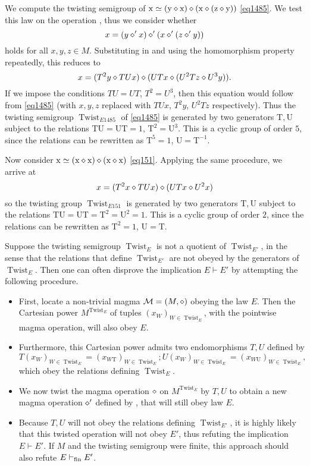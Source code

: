\begin{example}  We compute the twisting semigroup of $\mathrm{x} \simeq (\mathrm{y} \diamond \mathrm{x}) \diamond (\mathrm{x} \diamond (\mathrm{z} \diamond \mathrm{y}))$ \eqref{eq1485}.  We test this law on the operation , thus we consider whether
$$x = (y \diamond' x) \diamond' (x \diamond' (z \diamond' y))$$
holds for all $x,y,z \in M$.  Substituting in  and using the homomorphism property repeatedly, this reduces to
$$x = (T^2y \diamond TUx) \diamond (UTx \diamond (U^2T z \diamond U^3y)).$$
If we impose the conditions $TU=UT$, $T^2 = U^3$, then this equation would follow from \eqref{eq1485} (with $x,y,z$ replaced with $TUx$, $T^2 y$, $U^2 Tz$ respectively).  Thus the twisting semigroup $\operatorname{Twist}_{E1485}$ of \eqref{eq1485} is generated by two generators $\mathrm{T}, \mathrm{U}$ subject to the relations $\mathrm{T} \mathrm{U}=\mathrm{U} \mathrm{T} = 1$, $\mathrm{T}^2 = \mathrm{U}^3$.  This is a cyclic group of order $5$, since the relations can be rewritten as $\mathrm{T}^5 = 1$, $\mathrm{U} = \mathrm{T}^{-1}$.

Now consider $\mathrm{x} \simeq (\mathrm{x} \diamond \mathrm{x}) \diamond (\mathrm{x} \diamond \mathrm{x})$ \eqref{eq151}.  Applying the same procedure, we arrive at
$$x = (T^2 x \diamond TUx) \diamond (UT x \diamond U^2 x)$$
so the twisting group $\operatorname{Twist}_{E151}$ is generated by two generators $\mathrm{T}, \mathrm{U}$ subject to the relations $\mathrm{T} \mathrm{U}=\mathrm{U} \mathrm{T} = \mathrm{T}^2 = \mathrm{U}^2 = 1$.  This is a cyclic group of order $2$, since the relations can be rewritten as $\mathrm{T}^2 = 1$, $\mathrm{U} = \mathrm{T}$.
\end{example}

Suppose the twisting semigroup $\operatorname{Twist}_E$ is not a quotient of $\operatorname{Twist}_{E'}$, in the sense that the relations that define $\operatorname{Twist}_{E'}$ are not obeyed by the generators of $\operatorname{Twist}_E$.  Then one can often disprove the implication $E \vdash E'$ by attempting the following procedure.
\begin{itemize}
\item First, locate a non-trivial magma ${\mathcal{M}} = (M,\diamond)$ obeying the law $E$.  Then the Cartesian power $M^{\operatorname{Twist}_E}$ of tuples $(x_W)_{W \in \operatorname{Twist}_E}$, with the pointwise magma operation, will also obey $E$.
\item Furthermore, this Cartesian power admits two endomorphisms $T, U$ defined by
$$ T (x_W)_{W \in \operatorname{Twist}_E} = (x_{W \mathrm{T}})_{W \in \operatorname{Twist}_E};
U (x_W)_{W \in \operatorname{Twist}_E} = (x_{W \mathrm{U}})_{W \in \operatorname{Twist}_E},$$
which obey the relations defining $\operatorname{Twist}_E$.
\item We now twist the magma operation $\diamond$ on $M^{\operatorname{Twist}_E}$ by $T,U$ to obtain a new magma operation $\diamond'$ defined by , that will still obey law $E$.
\item Because $T, U$ will not obey the relations defining $\operatorname{Twist}_{E'}$, it is highly likely that this twisted operation will not obey $E'$, thus refuting the implication $E \vdash E'$.  If $M$ and the twisting semigroup were finite, this approach should also refute $E \vdash_{\mathrm{fin}} E'$.
\end{itemize}

